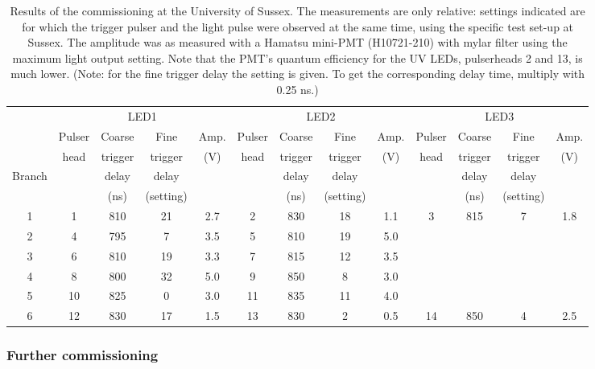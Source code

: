 \begin{table}[h!]
  \begin{center}
    \caption{Results of the commissioning at the University of Sussex. The measurements are only relative: settings indicated are for which the trigger pulser and the light pulse were observed at the same time, using the specific test set-up at Sussex. The amplitude was as measured with a Hamatsu mini-PMT (H10721-210) with mylar filter using the maximum light output setting. Note that the PMT's quantum efficiency for the UV LEDs, pulserheads 2 and 13, is much lower. (Note: for the fine trigger delay the setting is given. To get the corresponding delay time, multiply with 0.25 ns.)}
    \label{table:sussex_commissioning}
    \begin{tabular}{|c|c|c|c|c|c|c|c|c|c|c|c|c|} 
	\hline
	 & \multicolumn{4}{c|}{LED1} & \multicolumn{4}{c|}{LED2} & \multicolumn{4}{c|}{LED3} \\
	\cline{2-13}
		        & Pulser & Coarse   & Fine   & Amp.
		        & Pulser & Coarse   & Fine   & Amp.
		        & Pulser & Coarse   & Fine   & Amp. \\
	              & head    & trigger & trigger & (V) 
			 & head    & trigger & trigger & (V) 
                    & head    & trigger & trigger & (V) \\
	Branch    & & delay & delay & & & delay & delay & & & delay & delay & \\
	             & & (ns) & (setting) & & & (ns) & (setting) & & & (ns) & (setting) & \\
       \hline 
	1 & 1 & 810 & 21 & 2.7 & 2 & 830 & 18 & 1.1 & 3 & 815 & 7 & 1.8 \\
	2 & 4 & 795 & 7  & 3.5 & 5 & 810 & 19 & 5.0 & & & & \\
	3 & 6 & 810 & 19 & 3.3 & 7 & 815 & 12 & 3.5 & & & & \\
	4 & 8 & 800 & 32 & 5.0 & 9 & 850 & 8 & 3.0 & & & & \\
	5 & 10 & 825 & 0 & 3.0 & 11 & 835 & 11 & 4.0 & & & & \\
	6 & 12 & 830 & 17 & 1.5 & 13 & 830 & 2 & 0.5 & 14 & 850 & 4 & 2.5 \\
	\hline
    \end{tabular}
  \end{center}
\end{table}

\subsubsection*{Further commissioning}

